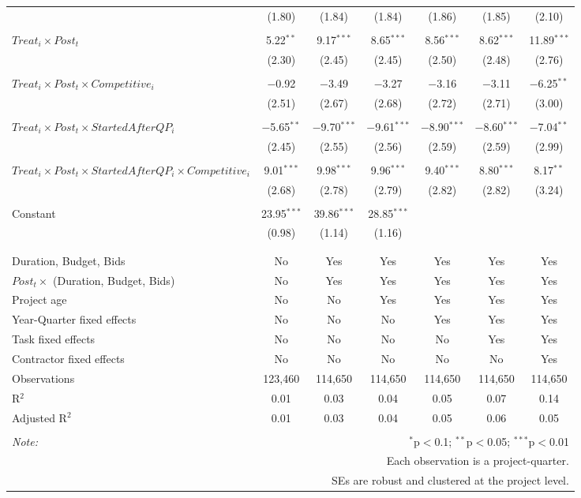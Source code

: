 \documentclass[
]{article}
\begin{document}
\begin{table}[H]
\begin{tabular}{@{\extracolsep{-3pt}}lcccccc}
  & (1.80) & (1.84) & (1.84) & (1.86) & (1.85) & (2.10) \\ 
  & & & & & & \\ 
 $Treat_i \times Post_t$ & 5.22$^{**}$ & 9.17$^{***}$ & 8.65$^{***}$ & 8.56$^{***}$ & 8.62$^{***}$ & 11.89$^{***}$ \\ 
  & (2.30) & (2.45) & (2.45) & (2.50) & (2.48) & (2.76) \\ 
  & & & & & & \\ 
 $Treat_i \times Post_t \times Competitive_i$ & $-$0.92 & $-$3.49 & $-$3.27 & $-$3.16 & $-$3.11 & $-$6.25$^{**}$ \\ 
  & (2.51) & (2.67) & (2.68) & (2.72) & (2.71) & (3.00) \\ 
  & & & & & & \\ 
 $Treat_i \times Post_t \times StartedAfterQP_i$ & $-$5.65$^{**}$ & $-$9.70$^{***}$ & $-$9.61$^{***}$ & $-$8.90$^{***}$ & $-$8.60$^{***}$ & $-$7.04$^{**}$ \\ 
  & (2.45) & (2.55) & (2.56) & (2.59) & (2.59) & (2.99) \\ 
  & & & & & & \\ 
 $Treat_i \times Post_t \times StartedAfterQP_i \times Competitive_i$ & 9.01$^{***}$ & 9.98$^{***}$ & 9.96$^{***}$ & 9.40$^{***}$ & 8.80$^{***}$ & 8.17$^{**}$ \\ 
  & (2.68) & (2.78) & (2.79) & (2.82) & (2.82) & (3.24) \\ 
  & & & & & & \\ 
 Constant & 23.95$^{***}$ & 39.86$^{***}$ & 28.85$^{***}$ &  &  &  \\ 
  & (0.98) & (1.14) & (1.16) &  &  &  \\ 
  & & & & & & \\ 
\hline \\[-1.8ex] 
Duration, Budget, Bids & No & Yes & Yes & Yes & Yes & Yes \\ 
$Post_t \times $  (Duration, Budget, Bids) & No & Yes & Yes & Yes & Yes & Yes \\ 
Project age & No & No & Yes & Yes & Yes & Yes \\ 
Year-Quarter fixed effects & No & No & No & Yes & Yes & Yes \\ 
Task fixed effects & No & No & No & No & Yes & Yes \\ 
Contractor fixed effects & No & No & No & No & No & Yes \\ 
Observations & 123,460 & 114,650 & 114,650 & 114,650 & 114,650 & 114,650 \\ 
R$^{2}$ & 0.01 & 0.03 & 0.04 & 0.05 & 0.07 & 0.14 \\ 
Adjusted R$^{2}$ & 0.01 & 0.03 & 0.04 & 0.05 & 0.06 & 0.05 \\ 
\hline 
\hline \\[-1.8ex] 
\textit{Note:}  & \multicolumn{6}{r}{$^{*}$p$<$0.1; $^{**}$p$<$0.05; $^{***}$p$<$0.01} \\ 
 & \multicolumn{6}{r}{Each observation is a project-quarter.} \\ 
 & \multicolumn{6}{r}{SEs are robust and clustered at the project level.} \\ 
\end{tabular} 
\end{table}
\end{document}

